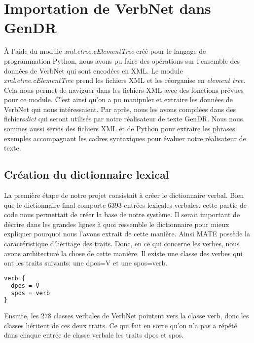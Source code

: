 \chapter{Importation de VerbNet dans GenDR}\label{ch:python}


À l'aide du module \emph{xml.etree.cElementTree} créé pour le langage de programmation Python, nous avons pu faire des opérations sur l'ensemble des données de VerbNet qui sont encodées en XML. Le module \emph{xml.etree.cElementTree} prend les fichiers XML et les réorganise en \emph{element tree}. Cela nous permet de naviguer dans les fichiers XML avec des fonctions prévues pour ce module. C'est ainsi qu'on a pu manipuler et extraire les données de VerbNet qui nous intéressaient. Par après, nous les avons compilées dans des fichiers\emph{dict} qui seront utilisés par notre réalisateur de texte GenDR. Nous nous sommes aussi servis des fichiers XML et de Python pour extraire les phrases exemples accompagnant les cadres syntaxiques pour évaluer notre réalisateur de texte.

\section{Création du dictionnaire lexical}

La première étape de notre projet consistait à créer le dictionnaire verbal. Bien que le dictionnaire final comporte 6393 entrées lexicales verbales, cette partie de code nous permettait de créer la base de notre système. Il serait important de décrire dans les grandes lignes à quoi ressemble le dictionnaire pour mieux expliquer pourquoi nous l'avons extrait de cette manière. Ainsi MATE possède la caractéristique d'héritage des traits. Donc, en ce qui concerne les verbes, nous avons architecturé la chose de cette manière. Il existe une classe des verbes qui ont les traits suivants: une dpos=V et une spos=verb.

\begin{lstlisting}[language=XML]
verb {
  dpos = V
  spos = verb
}
\end{lstlisting}

Ensuite, les 278 classes verbales de VerbNet pointent vers la classe verb, donc les classes héritent de ces deux traits. Ce qui fait en sorte qu'on n'a pas a répété dans chaque entrée de classe verbale les traits dpos et spos. 

